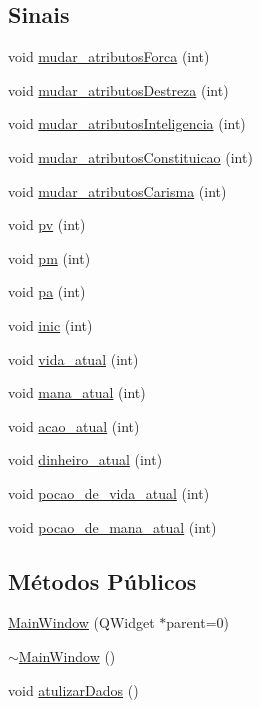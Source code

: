 \subsection*{Sinais}
\begin{DoxyCompactItemize}
\item 
void \hyperlink{class_main_window_a1f266c6dc033f3cd622a23526a707e3a}{mudar\+\_\+atributos\+Forca} (int)
\item 
void \hyperlink{class_main_window_a58c480645859287d0748f33db1ac6f01}{mudar\+\_\+atributos\+Destreza} (int)
\item 
void \hyperlink{class_main_window_a370f3a9d690ca64f1039fbfe0e53b245}{mudar\+\_\+atributos\+Inteligencia} (int)
\item 
void \hyperlink{class_main_window_ab0ecc3ebfbb38b4a3a775a614a84b785}{mudar\+\_\+atributos\+Constituicao} (int)
\item 
void \hyperlink{class_main_window_a5e98b6c94a1f5e469c242a0acd976155}{mudar\+\_\+atributos\+Carisma} (int)
\item 
void \hyperlink{class_main_window_ae85e30809106bb2c7517f0138931ff69}{pv} (int)
\item 
void \hyperlink{class_main_window_ad26f03bdbc050c7aafb9a980f860185c}{pm} (int)
\item 
void \hyperlink{class_main_window_a4d749e6affe917017b632bbc8e92255d}{pa} (int)
\item 
void \hyperlink{class_main_window_adcccf274033cd824252fba3eaba50049}{inic} (int)
\item 
void \hyperlink{class_main_window_ad0662ca7aff264d24250c5758f6a78aa}{vida\+\_\+atual} (int)
\item 
void \hyperlink{class_main_window_a1af874e03ad5046993b9a5d65d020eaa}{mana\+\_\+atual} (int)
\item 
void \hyperlink{class_main_window_a089e32820fe5916ab21d55f13db38658}{acao\+\_\+atual} (int)
\item 
void \hyperlink{class_main_window_a574a83ad071e949db94350382285a045}{dinheiro\+\_\+atual} (int)
\item 
void \hyperlink{class_main_window_a5493a7904845903c2cce21ec7e6b38a5}{pocao\+\_\+de\+\_\+vida\+\_\+atual} (int)
\item 
void \hyperlink{class_main_window_a9cd0839a3ca86169dd2ee0c34a495389}{pocao\+\_\+de\+\_\+mana\+\_\+atual} (int)
\end{DoxyCompactItemize}
\subsection*{Métodos Públicos}
\begin{DoxyCompactItemize}
\item 
\hyperlink{class_main_window_a8b244be8b7b7db1b08de2a2acb9409db}{Main\+Window} (Q\+Widget $\ast$parent=0)
\item 
\hyperlink{class_main_window_ae98d00a93bc118200eeef9f9bba1dba7}{$\sim$\+Main\+Window} ()
\item 
void \hyperlink{class_main_window_a4ce4094fd9e0e3fa1adf92431aba0890}{atulizar\+Dados} ()
\end{DoxyCompactItemize}



